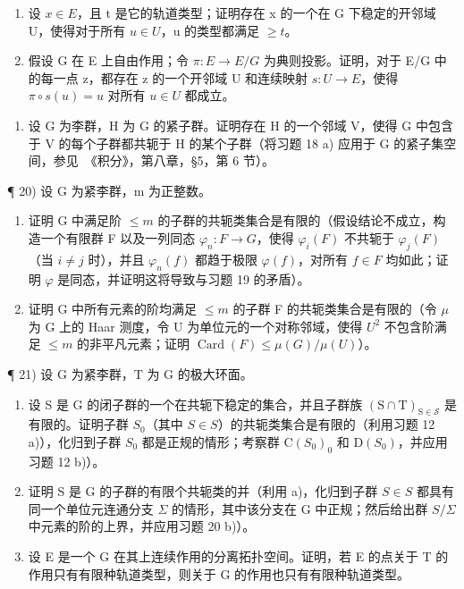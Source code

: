 \begin{enumerate}
\def\labelenumi{\alph{enumi})}
\item
  设 \(x \in E\)，且 t 是它的轨道类型；证明存在 x 的一个在 G 下稳定的开邻域 U，使得对于所有 \(u \in U\)，u 的类型都满足 \(\geq t\)。
\item
  假设 G 在 E 上自由作用；令 \(\pi: E \to E/G\) 为典则投影。证明，对于 E/G 中的每一点 z，都存在 z 的一个开邻域 U 和连续映射 \(s: U \to E\)，使得 \(\pi \circ s(u) = u\) 对所有 \(u \in U\) 都成立。
\end{enumerate}

\begin{enumerate}
\def\labelenumi{\arabic{enumi})}
\setcounter{enumi}{18}
\tightlist
\item
  设 G 为李群，H 为 G 的紧子群。证明存在 H 的一个邻域 V，使得 G 中包含于 V 的每个子群都共轭于 H 的某个子群（将习题 18 a) 应用于 G 的紧子集空间，参见~《积分》，第八章，§5，第 6 节）。
\end{enumerate}

¶ 20) 设 G 为紧李群，m 为正整数。

\begin{enumerate}
\def\labelenumi{\alph{enumi})}
\item
  证明 G 中满足阶 \(\leq m\) 的子群的共轭类集合是有限的（假设结论不成立，构造一个有限群 F 以及一列同态 \(\varphi_{n}: F \to G\)，使得 \(\varphi_{i}(F)\) 不共轭于 \(\varphi_{j}(F)\)（当 \(i \neq j\) 时），并且 \(\varphi_{n}(f)\) 都趋于极限 \(\varphi(f)\)，对所有 \(f \in F\) 均如此；证明 \(\varphi\) 是同态，并证明这将导致与习题 19 的矛盾）。
\item
  证明 G 中所有元素的阶均满足 \(\leq m\) 的子群 F 的共轭类集合是有限的（令 \(\mu\) 为 G 上的 Haar 测度，令 U 为单位元的一个对称邻域，使得 \(U^{2}\) 不包含阶满足 \(\leq m\) 的非平凡元素；证明 \(\operatorname{Card}(F) \leq \mu(G)/\mu(U)\)）。
\end{enumerate}

¶ 21) 设 G 为紧李群，T 为 G 的极大环面。

\begin{enumerate}
\def\labelenumi{\alph{enumi})}
\item
  设 S 是 G 的闭子群的一个在共轭下稳定的集合，并且子群族 \((\mathrm{S} \cap \mathrm{T})_{\mathrm{S} \in \mathcal{S}}\) 是有限的。证明子群 \(S_{0}\)（其中 \(S \in S\)）的共轭类集合是有限的（利用习题 12 a)），化归到子群 \(S_{0}\) 都是正规的情形；考察群 \(\mathrm{C}(S_{0})_{0}\) 和 \(\mathrm{D}(S_{0})\)，并应用习题 12 b)）。
\item
  证明 S 是 G 的子群的有限个共轭类的并（利用 a)，化归到子群 \(S \in S\) 都具有同一个单位元连通分支 \(\Sigma\) 的情形，其中该分支在 G 中正规；然后给出群 \(S/\Sigma\) 中元素的阶的上界，并应用习题 20 b)）。
\item
  设 E 是一个 G 在其上连续作用的分离拓扑空间。证明，若 E 的点关于 T 的作用只有有限种轨道类型，则关于 G 的作用也只有有限种轨道类型。
\end{enumerate}

